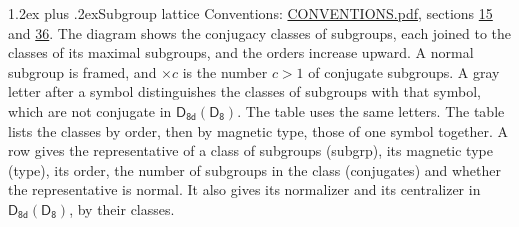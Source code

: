 \documentclass[10pt,a4paper]{article}
\makeatletter
\renewcommand\section{\@startsection{section}{1}{\z@}{-3ex plus -1ex minus -.2ex}%
  {1.2ex plus .2ex}{\normalfont\large\sffamily\bfseries\color{parttitle}}}
\numberwithin{equation}{section}
\newcommand{\grp}[1]{\mathsf{#1}}
\makeatother
\begin{document}
\section{Subgroup lattice}\label{s:subgroups}
Conventions: \href{../../CONVENTIONS.pdf}{CONVENTIONS.pdf}, sections \href{../../../rotation/CONVENTIONS.pdf\#conv.15}{15} and \href{../../CONVENTIONS.pdf\#conv.36}{36}.
The diagram shows the conjugacy classes of subgroups, each joined to the classes of its maximal subgroups, and the orders increase upward. \label{n:index.conjugates.c}\label{n:mark.conjugates}A normal subgroup is framed, and ${\times}c$ is the number $c > 1$ of conjugate subgroups. \label{n:mark.letter}A gray letter after a symbol distinguishes the classes of subgroups with that symbol, which are not conjugate in $\grp{D_{8d}}(\grp{D_{8}})$. The table uses the same letters. The table lists the classes by order, then by magnetic type, those of one symbol together. \label{n:head.subgroup}\label{n:head.magnetic.type}\label{n:head.order}\label{n:head.conjugates}\label{n:head.normal}A row gives the representative of a class of subgroups (subgrp), its magnetic type (type), its order, the number of subgroups in the class (conjugates) and whether the representative is normal. \label{n:head.normalizer}\label{n:head.centralizer}It also gives its normalizer and its centralizer in $\grp{D_{8d}}(\grp{D_{8}})$, by their classes. 
\end{document}
